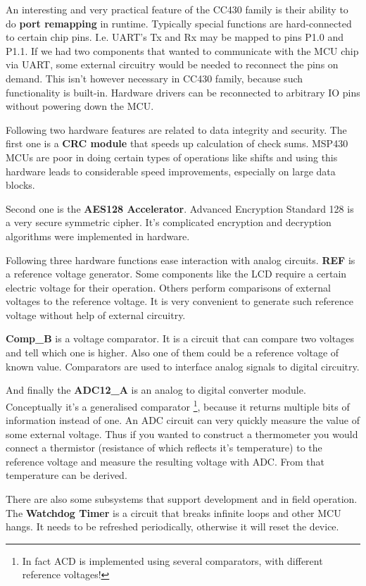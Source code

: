 An interesting and very practical feature of the CC430 family is
their ability to do {\bf port remapping} in runtime. Typically special
functions are hard-connected to certain chip pins. I.e. UART's Tx and
Rx may be mapped to pins P1.0 and P1.1. If we had two components that
wanted to communicate with the MCU chip via UART, some external
circuitry would be needed to reconnect the pins on demand. This isn't
however necessary in CC430 family, because such functionality is
built-in. Hardware drivers can be reconnected to arbitrary IO pins
without powering down the MCU.

Following two hardware features are related to data integrity and
security. The first one is a {\bf CRC module} that speeds up
calculation of check sums.  MSP430 MCUs are poor in doing certain
types of operations like shifts and using this hardware leads to
considerable speed improvements, especially on large data blocks.

Second one is the {\bf AES128 Accelerator}. Advanced Encryption
Standard 128 is a very secure symmetric cipher. It's complicated
encryption and decryption algorithms were implemented in hardware.

Following three hardware functions ease interaction with analog
circuits.  {\bf REF} is a reference voltage generator. Some components
like the LCD require a certain electric voltage for their operation.
Others perform comparisons of external voltages to the reference
voltage. It is very convenient to generate such reference voltage
without help of external circuitry.

{\bf Comp\_B} is a voltage comparator. It is a circuit that can
compare two voltages and tell which one is higher. Also one of them
could be a reference voltage of known value. Comparators are used to
interface analog signals to digital circuitry.

And finally the {\bf ADC12\_A} is an analog to digital converter
module. Conceptually it's a generalised comparator \footnote{In
fact ACD is implemented using several comparators, with different
reference voltages!}, because it returns multiple bits of information
instead of one.  An ADC circuit can very quickly measure the value of
some external voltage. Thus if you wanted to construct a thermometer
you would connect a thermistor (resistance of which reflects it's
temperature) to the reference voltage and measure the resulting
voltage with ADC. From that temperature can be derived.

There are also some subsystems that support development and in field
operation. The {\bf Watchdog Timer} is a circuit that breaks infinite
loops and other MCU hangs. It needs to be refreshed periodically,
otherwise it will reset the device.

